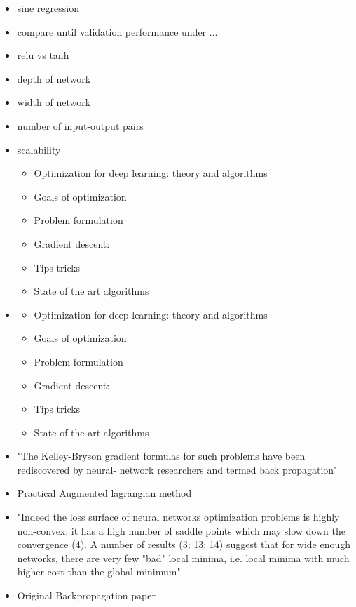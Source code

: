 \begin{itemize}
\item sine regression

	\item compare until validation performance under ...
	\item relu vs tanh
	\item depth of network
	\item width of network
	\item number of input-output pairs
	\item scalability
	
	
	
\begin{itemize}
	\item Optimization for deep learning: theory and algorithms
	\item Goals of optimization
	\item Problem formulation
	\item Gradient descent:
	\item Tips  tricks
	\item State of the art algorithms
\end{itemize}







\item
\cite{sun2019optimization}
\begin{itemize}
	\item Optimization for deep learning: theory and algorithms
	\item Goals of optimization
	\item Problem formulation
	\item Gradient descent:
	\item Tips  tricks
	\item State of the art algorithms
\end{itemize}


\item
\cite{dreyfus1990}

"The Kelley-Bryson gradient
formulas for such problems have been rediscovered by neural-
network researchers and termed back propagation"

\item
\cite{Birgin2009}

Practical Augmented lagrangian method

\item
\cite{jacot2020neural}
"Indeed
the loss surface of neural networks optimization problems is highly non-convex: it has a high number
of saddle points which may slow down the convergence (4). A number of results (3; 13; 14) suggest
that for wide enough networks, there are very few "bad" local minima, i.e. local minima with much
higher cost than the global minimum"
\item
\cite{Rumelhart1986}
Original Backpropagation paper


\end{itemize}

